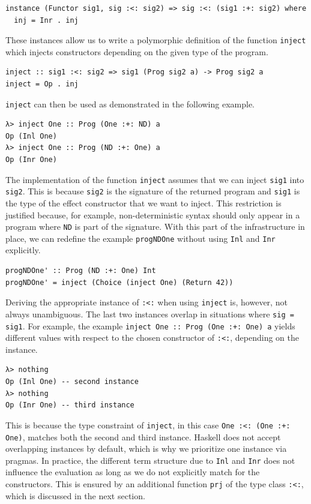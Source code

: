 \documentclass[a4paper, 11pt, fleqn, twoside]{scrreprt}
\newcommand{\hinl}[1]{\texttt{#1}}
\begin{document}
\begin{verbatim}
instance (Functor sig1, sig :<: sig2) => sig :<: (sig1 :+: sig2) where
  inj = Inr . inj
\end{verbatim}

These instances allow us to write a polymorphic definition of the function \hinl{inject} which injects constructors depending on the given type of the program.

\begin{verbatim}
inject :: sig1 :<: sig2 => sig1 (Prog sig2 a) -> Prog sig2 a
inject = Op . inj
\end{verbatim}

\hinl{inject} can then be used as demonstrated in the following example.

\begin{verbatim}
λ> inject One :: Prog (One :+: ND) a
Op (Inl One)
λ> inject One :: Prog (ND :+: One) a
Op (Inr One)
\end{verbatim}

The implementation of the function \hinl{inject} assumes that we can inject \hinl{sig1} into \hinl{sig2}.
This is because \hinl{sig2} is the signature of the returned program and \hinl{sig1} is the type of the effect constructor that we want to inject.
This restriction is justified because, for example, non-deterministic syntax should only appear in a program where \hinl{ND} is part of the signature.
With this part of the infrastructure in place, we can redefine the example \hinl{progNDOne} without using \hinl{Inl} and \hinl{Inr} explicitly.

\begin{verbatim}
progNDOne' :: Prog (ND :+: One) Int
progNDOne' = inject (Choice (inject One) (Return 42))
\end{verbatim}

Deriving the appropriate instance of \hinl{:<:} when using \hinl{inject} is, however, not always unambiguous.
The last two instances overlap in situations where \hinl{sig = sig1}.
For example, the example \hinl{inject One :: Prog (One :+: One) a} yields different values with respect to the chosen constructor of \hinl{:<:}, depending on the instance.

\begin{verbatim}
λ> nothing
Op (Inl One) -- second instance
λ> nothing
Op (Inr One) -- third instance
\end{verbatim}

This is because the type constraint of \hinl{inject}, in this case \hinl{One :<: (One :+: One)}, matches both the second and third instance.
Haskell does not accept overlapping instances by default, which is why we prioritize one instance via pragmas.
In practice, the different term structure due to \hinl{Inl} and \hinl{Inr} does not influence the evaluation as long as we do not explicitly match for the constructors.
This is ensured by an additional function \hinl{prj} of the type class \hinl{:<:}, which is discussed in the next section.
\end{document}
